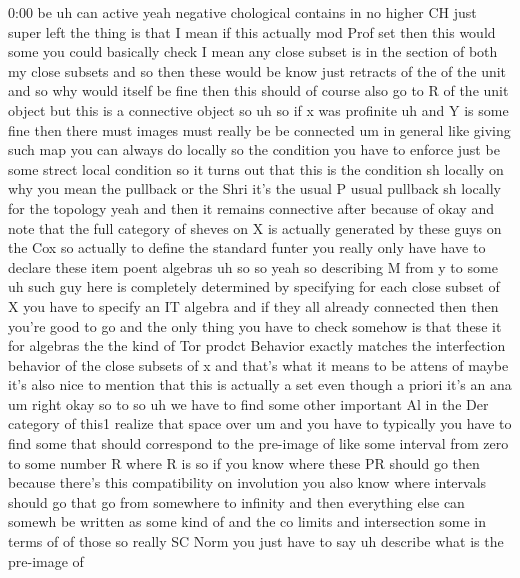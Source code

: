 \begin{unfinished}{0:00}
be  uh  can  active  yeah  negative
chological  contains
in  no  higher  CH  just  super
left  the  thing  is
that  I  mean  if  this  actually  mod  Prof
set  then  this  would  some  you  could
basically  check  I  mean  any  close  subset
is  in  the  section
of  both  my  close
subsets  and  so  then  these  would  be  know
just  retracts  of  the  of  the  unit  and  so
why  would  itself  be  fine  then  this
should  of  course  also  go  to  R  of  the
unit  object  but  this  is  a  connective
object
so  uh  so  if  x  was
profinite  uh  and  Y  is  some  fine  then
there
must  images  must  really  be  be  connected
um  in  general  like  giving  such  map  you
can  always  do  locally  so  the  condition
you  have  to  enforce  just  be  some  strect
local  condition  so  it  turns  out  that
this  is  the  condition
sh  locally  on  why  you  mean  the  pullback
or  the  Shri  it's  the  usual  P  usual
pullback  sh  locally  for  the  topology
yeah  and  then  it  remains  connective
after  because  of
okay  and  note  that  the  full  category  of
sheves  on  X  is  actually  generated  by
these  guys  on  the  Cox  so  actually  to
define  the  standard  funter  you  really
only  have  have  to  declare  these  item
poent
algebras  uh  so  so  yeah  so  describing  M
from  y  to  some  uh  such  guy  here  is
completely  determined  by  specifying  for
each  close  subset  of  X  you  have  to
specify  an  IT  algebra  and  if  they  all
already  connected  then  then  you're  good
to  go  and  the  only  thing  you  have  to
check  somehow  is  that  these  it  for
algebras  the  the  kind  of  Tor  prodct
Behavior  exactly  matches  the
interfection  behavior  of  the  close
subsets  of  x
and  that's  what  it  means  to  be  attens
of  maybe  it's  also  nice  to  mention  that
this  is  actually  a  set  even  though  a
priori  it's  an
ana  um
right
okay  so  to
so  uh  we  have  to  find  some  other
important
Al
in  the  Der  category  of
this1  realize  that  space
over
um  and  you  have  to  typically  you  have  to
find  some  that  should  correspond  to  the
pre-image
of  like  some  interval  from  zero  to  some
number
R  where  R
is  so  if  you  know  where  these  PR  should
go  then  because  there's  this
compatibility  on  involution  you  also
know  where  intervals  should  go  that  go
from  somewhere  to  infinity  and  then
everything  else  can  somewh  be  written  as
some  kind  of  and  the  co  limits  and
intersection  some  in  terms
of  of  those  so
really  SC  Norm  you  just  have  to
say  uh  describe  what  is  the  pre-image  of

\end{unfinished}

